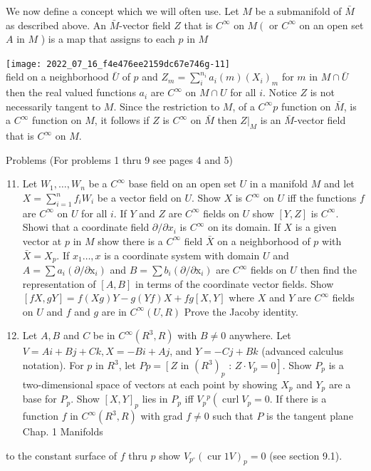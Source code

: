 \documentclass[10pt]{article}
\begin{document}
We now define a concept which we will often use. Let $M$ be a submanifold of $\bar{M}$ as described above. An $\bar{M}$-vector field $Z$ that is $C^{\infty}$ on $M\left(\right.$ or $C^{\infty}$ on an open set $A$ in $M$ ) is a map that assigns to each $p$ in $M$

\texttt{[image: 2022\_07\_16\_f4e476ee2159dc67e746g-11]}\\
field on a neighborhood $\bar{U}$ of $p$ and $Z_{m}=\sum_{i}^{n_{i}} a_{i}(m)\left(X_{i}\right)_{m}$ for $m$ in $M \cap \bar{U}$ then the real valued functions $a_{i}$ are $C^{\infty}$ on $M \cap U$ for all $i$. Notice $Z$ is not necessarily tangent to $M$. Since the restriction to $M$, of a $C^{\infty} p$ function on $\bar{M}$, is a $C^{\infty}$ function on $M$, it follows if $Z$ is $C^{\infty}$ on $\bar{M}$ then $\left.Z\right|_{M}$ is an $\bar{M}$-vector field that is $C^{\infty}$ on $M$.

Problems (For problems 1 thru 9 see pages 4 and 5)

\begin{enumerate}
  \setcounter{enumi}{10}
  \item Let $W_{1}, \ldots, W_{n}$ be a $C^{\infty}$ base field on an open set $U$ in a manifold $M$ and let $X=\sum_{i=1}^{n} f_{i} W_{i}$ be a vector field on $U$. Show $X$ is $C^{\infty}$ on $U$ iff the functions $f$ are $C^{\infty}$ on $U$ for all $i$. If $Y$ and $Z$ are $C^{\infty}$ fields on $U$ show $[Y, Z]$ is $C^{\infty}$. Showi that a coordinate field $\partial / \partial x_{i}$ is $C^{\infty}$ on its domain. If $X$ is a given vector at $p$ in $M$ show there is a $C^{\infty}$ field $\bar{X}$ on a neighborhood of $p$ with $\bar{X}=X_{p}$. If $x_{1} \ldots, x$ is a coordinate system with domain $U$ and $A=\sum a_{i}\left(\partial / \partial \mathrm{x}_{i}\right)$ and $B=\sum b_{i}\left(\partial / \partial \mathrm{x}_{i}\right)$ are $C^{\infty}$ fields on $U$ then find the representation of $[A, B]$ in terms of the coordinate vector fields. Show $[f X, g Y]=f(X g) Y-g(Y f) X+f g[X, Y]$ where $X$ and $Y$ are $C^{\infty}$ fields on $U$ and $f$ and $g$ are in $C^{\infty}(U, R)$ Prove the Jacoby identity.

  \item Let $A, B$ and $C$ be in $C^{\infty}\left(R^{3}, R\right)$ with $B \neq 0$ anywhere. Let $V=A i+B j+C k, X=-B i+A j$, and $Y=-C j+B k$ (advanced calculus notation). For $p$ in $R^{3}$, let $P p=\left[Z\right.$ in $\left(R^{3}\right)_{p}$ : $\left.Z \cdot V_{p}=0\right]$. Show $P_{p}$ is a two-dimensional space of vectors at each point by showing $X_{p}$ and $Y_{p}$ are a base for $P_{p}$. Show $[X, Y]_{p}$ lies in $P_{p}$ iff $V_{p}{ }^{p}\left(\operatorname{curl} V_{p}=0\right.$. If there is a function $f$ in $C^{\infty}\left(R^{3}, R\right)$ with grad $f \neq 0$ such that $P$ is the tangent plane Chap. 1 Manifolds

\end{enumerate}
to the constant surface of $f$ thru $p$ show $V_{p^{\circ}}(\operatorname{cur} 1 V)_{p}=0$ (see section 9.1).
\end{document}

